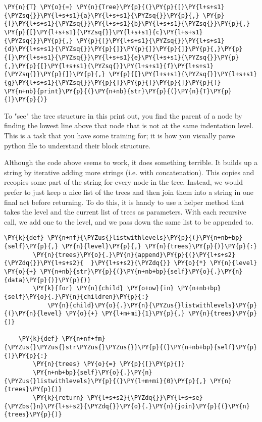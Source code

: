 \begin{Verbatim}[commandchars=\\\{\}]
\PY{n}{T} \PY{o}{=} \PY{n}{Tree}\PY{p}{(}\PY{p}{[}\PY{l+s+s1}{\PYZsq{}}\PY{l+s+s1}{a}\PY{l+s+s1}{\PYZsq{}}\PY{p}{,} \PY{p}{[}\PY{l+s+s1}{\PYZsq{}}\PY{l+s+s1}{b}\PY{l+s+s1}{\PYZsq{}}\PY{p}{,} \PY{p}{[}\PY{l+s+s1}{\PYZsq{}}\PY{l+s+s1}{c}\PY{l+s+s1}{\PYZsq{}}\PY{p}{,} \PY{p}{[}\PY{l+s+s1}{\PYZsq{}}\PY{l+s+s1}{d}\PY{l+s+s1}{\PYZsq{}}\PY{p}{]}\PY{p}{]}\PY{p}{]}\PY{p}{,}\PY{p}{[}\PY{l+s+s1}{\PYZsq{}}\PY{l+s+s1}{e}\PY{l+s+s1}{\PYZsq{}}\PY{p}{,}\PY{p}{[}\PY{l+s+s1}{\PYZsq{}}\PY{l+s+s1}{f}\PY{l+s+s1}{\PYZsq{}}\PY{p}{]}\PY{p}{,} \PY{p}{[}\PY{l+s+s1}{\PYZsq{}}\PY{l+s+s1}{g}\PY{l+s+s1}{\PYZsq{}}\PY{p}{]}\PY{p}{]}\PY{p}{]}\PY{p}{)}
\PY{n+nb}{print}\PY{p}{(}\PY{n+nb}{str}\PY{p}{(}\PY{n}{T}\PY{p}{)}\PY{p}{)}
\end{Verbatim}



To "see" the tree structure in this print out, you find the parent of a node by finding the lowest line above that node that is not at the same indentation level.
This is a task that you have some training for; it is how you visually parse python file to understand their block structure.


Although the code above seems to work, it does something terrible.
It builds up a string by iterative adding more strings (i.e. with concatenation).
This copies and recopies some part of the string for every node in the tree.
Instead, we would prefer to just keep a nice list of the trees and then join them into a string in one final act before returning.
To do this, it is handy to use a helper method that takes the level and the current list of trees as parameters.
With each recursive call, we add one to the level, and we pass down the same list to be appended to.

\begin{Verbatim}[commandchars=\\\{\}]
    \PY{k}{def} \PY{n+nf}{\PYZus{}listwithlevels}\PY{p}{(}\PY{n+nb+bp}{self}\PY{p}{,} \PY{n}{level}\PY{p}{,} \PY{n}{trees}\PY{p}{)}\PY{p}{:}
        \PY{n}{trees}\PY{o}{.}\PY{n}{append}\PY{p}{(}\PY{l+s+s2}{\PYZdq{}}\PY{l+s+s2}{  }\PY{l+s+s2}{\PYZdq{}} \PY{o}{*} \PY{n}{level} \PY{o}{+} \PY{n+nb}{str}\PY{p}{(}\PY{n+nb+bp}{self}\PY{o}{.}\PY{n}{data}\PY{p}{)}\PY{p}{)}
        \PY{k}{for} \PY{n}{child} \PY{o+ow}{in} \PY{n+nb+bp}{self}\PY{o}{.}\PY{n}{children}\PY{p}{:}
            \PY{n}{child}\PY{o}{.}\PY{n}{\PYZus{}listwithlevels}\PY{p}{(}\PY{n}{level} \PY{o}{+} \PY{l+m+mi}{1}\PY{p}{,} \PY{n}{trees}\PY{p}{)}

    \PY{k}{def} \PY{n+nf+fm}{\PYZus{}\PYZus{}str\PYZus{}\PYZus{}}\PY{p}{(}\PY{n+nb+bp}{self}\PY{p}{)}\PY{p}{:}
        \PY{n}{trees} \PY{o}{=} \PY{p}{[}\PY{p}{]}
        \PY{n+nb+bp}{self}\PY{o}{.}\PY{n}{\PYZus{}listwithlevels}\PY{p}{(}\PY{l+m+mi}{0}\PY{p}{,} \PY{n}{trees}\PY{p}{)}
        \PY{k}{return} \PY{l+s+s2}{\PYZdq{}}\PY{l+s+se}{\PYZbs{}n}\PY{l+s+s2}{\PYZdq{}}\PY{o}{.}\PY{n}{join}\PY{p}{(}\PY{n}{trees}\PY{p}{)}
\end{Verbatim}


